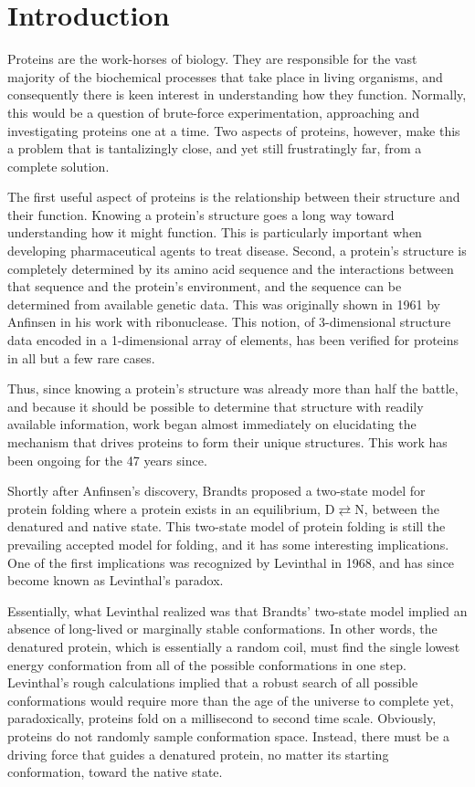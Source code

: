 \section*{Introduction}
\label{sec:introduction}
Proteins are the work-horses of biology. They are responsible for the vast majority of the biochemical processes that take place in living organisms, and consequently there is keen interest in understanding how they function. Normally, this would be a question of brute-force experimentation, approaching and investigating proteins one at a time. Two aspects of proteins, however, make this a problem that is tantalizingly close, and yet still frustratingly far, from a complete solution.

The first useful aspect of proteins is the relationship between their structure and their function. Knowing a protein's structure goes a long way toward understanding how it might function. This is particularly important when developing pharmaceutical agents to treat disease. Second, a protein's structure is completely determined by its amino acid sequence and the interactions between that sequence and the protein's environment, and the sequence can be determined from available genetic data. This was originally shown in 1961 by Anfinsen\cite{Service:2008p294} in his work with ribonuclease. This notion, of 3-dimensional structure data encoded in a 1-dimensional array of elements, has been verified for proteins in all but a few rare cases.

Thus, since knowing a protein's structure was already more than half the battle, and because it should be possible to determine that structure with readily available information, work began almost immediately on elucidating the mechanism that drives proteins to form their unique structures. This work has been ongoing for the 47 years since.

Shortly after Anfinsen's discovery, Brandts proposed a two-state model for protein folding where a protein exists in an equilibrium, $\mathrm{D} \rightleftarrows \mathrm{N}$, between the denatured and native state\cite{Clark:2008p141}. This two-state model of protein folding is still the prevailing accepted model for folding, and it has some interesting implications. One of the first implications was recognized by Levinthal in 1968, and has since become known as Levinthal's paradox.

Essentially, what Levinthal realized was that Brandts' two-state model implied an absence of long-lived or marginally stable conformations. In other words, the denatured protein, which is essentially a random coil, must find the single lowest energy conformation from all of the possible conformations in one step. Levinthal's rough calculations implied that a robust search of all possible conformations would require more than the age of the universe to complete yet, paradoxically, proteins fold on a millisecond to second time scale. Obviously, proteins do not randomly sample conformation space. Instead, there must be a driving force that guides a denatured protein, no matter its starting conformation, toward the native state.

